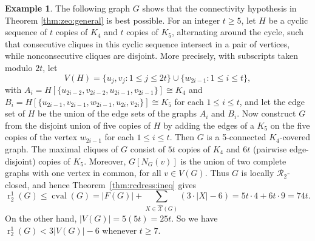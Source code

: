 \documentclass[11pt,a4paper]{article}
\theoremstyle{definition}
\newtheorem{example}[theorem]{Example}
\DeclareMathOperator{\rr}{r}
\DeclareMathOperator{\cval}{cval}
\newcommand{\cR}{\mathcal{R}}
\newcommand{\cX}{\mathcal{X}}
\newcommand{\hXX}{\hat{\mathcal{X}}}
\newcommand{\cC}{\mathcal{C}}
\begin{document}
\begin{example}\label{ex:kette}
The following graph $G$ shows that the connectivity hypothesis in Theorem \ref{thm:zeo:general} is best possible.
For an integer $t\geq 5$, let $H$ be a cyclic sequence of $t$
copies of $K_4$ and $t$ copies of $K_5$, alternating around the
cycle, such that consecutive cliques in this cyclic sequence intersect in
a pair of vertices, while nonconsecutive cliques are disjoint. More precisely, with subscripts taken modulo $2t$, let
$$
V(H)=\{u_j,v_j:1\leq j\leq2t\}
\cup\{w_{2i-1}:1\leq i\leq t\},
$$
with
$
A_i=H[\{u_{2i-2},v_{2i-2},u_{2i-1},v_{2i-1}\}]
\cong K_4
$
and
 $B_i=H[\{u_{2i-1},v_{2i-1},w_{2i-1},
u_{2i},v_{2i}\}]
\cong K_5
$ for each $1\leq i\leq t$, and let the edge set of $H$ be the union of the edge sets of the graphs $A_i$ and $B_i$. 
Now construct $G$ from the disjoint union of five copies of $H$ by 
adding the edges of a $K_5$ on the five copies of the vertex $w_{2i-1}$ for each $1\leq i\leq t$. Then $G$ is a 5-connected $K_4$-covered graph. The maximal cliques of $G$ consist of $5t$ copies of $K_4$ and $6t$ (pairwise edge-disjoint) copies of $K_5$.
Moreover, $G[N_G(v)]$ is the union of two
complete graphs with one vertex in common, for all $v\in V(G)$.
Thus
$G$ is locally $\cR_2$-closed, and hence
Theorem~\ref{thm:rcdress:ineq} gives
 $$\rr_2^1(G)\leq \cval(G)=|F(G)|+\sum_{X\in \hXX(G)}(3\cdot |X|-6)= 5t\cdot 4+6t\cdot 9=74t.$$
On the other hand, $|V(G)|=5(5t)=25t$. So we have $\rr_2^1(G)<3|V(G)|-6$ whenever $t\geq 7$.
\end{example}
\end{document}
